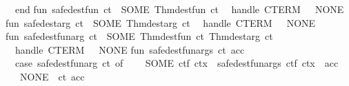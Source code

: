 \begin{isabellebody}
\ \ end{}\isanewline
\isanewline
fun\ safe{}dest{}fun\ ct\ {}\ SOME\ {}Thm{}dest{}fun\ ct{}\isanewline
\ \ handle\ CTERM\ {}\ {}{}\ NONE\isanewline
\isanewline
fun\ safe{}dest{}arg\ ct\ {}\ SOME\ {}Thm{}dest{}arg\ ct{}\isanewline
\ \ handle\ CTERM\ {}\ {}{}\ NONE\isanewline
\isanewline
fun\ safe{}dest{}funarg\ ct\ {}\ SOME\ {}Thm{}dest{}fun\ ct{}\ Thm{}dest{}arg\ ct{}\isanewline
\ \ handle\ CTERM\ {}\ {}{}\ NONE\isanewline
\isanewline
fun\ safe{}dest{}funargs\ ct\ acc\ {}\isanewline
\ \ case\ safe{}dest{}funarg\ ct\ of\isanewline
\ \ \ \ SOME\ {}ct{}f{}\ ct{}x{}\ {}{}\ safe{}dest{}funargs\ ct{}f\ {}ct{}x\ {}{}\ acc{}\isanewline
\ \ {}\ NONE\ {}{}\ {}ct{}\ acc{}\isanewline

\end{isabellebody}
